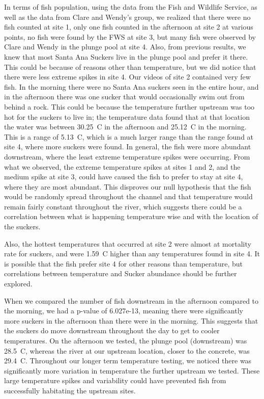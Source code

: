 \documentclass{article}
\begin{document}
In terms of fish population, using the data from the Fish and Wildlife Service, as well as the data from Clare and Wendy's group, we realized that there were no fish counted at site 1, only one fish counted in the afternoon at site 2 at various points, no fish were found by the FWS at site 3, but many fish were observed by Clare and Wendy in the plunge pool at site 4. Also, from previous results, we knew that most Santa Ana Suckers live in the plunge pool and prefer it there. This could be because of reasons other than temperature, but we did notice that there were less extreme spikes in site 4. Our videos of site 2 contained very few fish. In the morning there were no Santa Ana suckers seen in the entire hour, and in the afternoon there was one sucker that would occasionally swim out from behind a rock.  This could be because the temperature further upstream was too hot for the suckers to live in; the temperature data found that at that location the water was between 30.25\textdegree~C in the afternoon and 25.12\textdegree~C in the morning. This is a range of 5.13\textdegree~C, which is a much larger range than the range found at site 4, where more suckers were found. In general, the fish were more abundant downstream, where the least extreme temperature spikes were occurring. From what we observed, the extreme temperature spikes at sites 1 and 2, and the medium spike at site 3, could have caused the fish to prefer to stay at site 4, where they are most abundant. This disproves our null hypothesis that the fish would be randomly spread throughout the channel and that temperature would remain fairly constant throughout the river, which suggests there could be a correlation between what is happening temperature wise and with the location of the suckers.

Also, the hottest temperatures that occurred at site 2 were almost at mortality rate for suckers, and were 1.59\textdegree~C higher than any temperatures found in site 4. It is possible that the fish prefer site 4 for other reasons than temperature, but correlations between temperature and Sucker abundance should be further explored.

When we compared the number of fish downstream in the afternoon compared to the morning, we had a p-value of 6.027e-13, meaning there were significantly more suckers in the afternoon than there were in the morning.  This suggests that the suckers do move downstream throughout the day to get to cooler temperatures.  On the afternoon we tested, the plunge pool (downstream) was 28.5\textdegree~C, whereas the river at our upstream location, closer to the concrete, was 29.4\textdegree~C. Throughout our longer term temperature testing, we noticed there was significantly more variation in temperature the further upstream we tested. These large temperature spikes and variability could have prevented fish from successfully habitating the upstream sites. 
\end{document}
